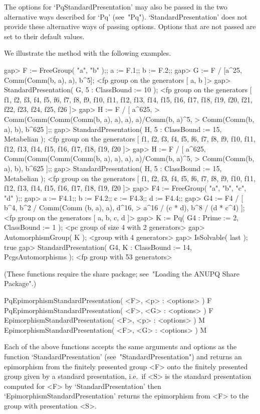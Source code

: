 \enditems

The options for `PqStandardPresentation' may also be passed  in  the  two
alternative ways described for  `Pq'  (see~"Pq").  `StandardPresentation'
does not provide these alternative ways of passing options. Options  that
are not passed are set to their default values.

We illustrate the method with the following examples.

\beginexample
gap> F := FreeGroup( "a", "b" );; a := F.1;; b := F.2;;
gap> G := F / [a^25, Comm(Comm(b, a), a), b^5];        
<fp group on the generators [ a, b ]>
gap> StandardPresentation( G, 5 : ClassBound := 10 );  
<fp group on the generators [ f1, f2, f3, f4, f5, f6, f7, f8, f9, f10, f11, 
  f12, f13, f14, f15, f16, f17, f18, f19, f20, f21, f22, f23, f24, f25, f26 ]>
gap> H := F / [ a^625,
>               Comm(Comm(Comm(Comm(b, a), a), a), a)/Comm(b, a)^5,
>               Comm(Comm(b, a), b), b^625 ];;
gap> StandardPresentation( H, 5 : ClassBound := 15, Metabelian );
<fp group on the generators [ f1, f2, f3, f4, f5, f6, f7, f8, f9, f10, f11, 
  f12, f13, f14, f15, f16, f17, f18, f19, f20 ]>
gap> H := F / [ a^625, Comm(Comm(Comm(Comm(b, a), a), a), a)/Comm(b, a)^5,
>               Comm(Comm(b, a), b), b^625 ];;                     
gap> StandardPresentation( H, 5 : ClassBound := 15, Metabelian );
<fp group on the generators [ f1, f2, f3, f4, f5, f6, f7, f8, f9, f10, f11, 
  f12, f13, f14, f15, f16, f17, f18, f19, f20 ]>
gap> F4 := FreeGroup( "a", "b", "c", "d" );;                        
gap> a := F4.1;; b := F4.2;; c := F4.3;; d := F4.4;;
gap> G4 := F4 / [ b^4, b^2 / Comm(Comm (b, a), a), d^16,                
>                 a^16 / (c * d), b^8 / (d * c^4) ];
<fp group on the generators [ a, b, c, d ]>
gap> K := Pq( G4 : Prime := 2, ClassBound := 1 );
<pc group of size 4 with 2 generators>
gap> AutomorphismGroup( K );
<group with 4 generators>
gap> IsSolvable( last );
true
gap> StandardPresentation( G4, K : ClassBound := 14, PcgsAutomorphisms );
<fp group with 53 generators>
\endexample

(These functions require the {\ANUPQ}  share  package;  see~"Loading  the
ANUPQ Share Package".)

\>PqEpimorphismStandardPresentation( <F>, <p> : <options> ) F
\>PqEpimorphismStandardPresentation( <F>, <G> : <options> ) F
\>EpimorphismStandardPresentation( <F>, <p> : <options> ) M
\>EpimorphismStandardPresentation( <F>, <G> : <options> ) M

Each of the above functions accepts the same arguments and options as the
function `StandardPresentation' (see~"StandardPresentation") and  returns
an epimorphism from the finitely presented group <F>  onto  the  finitely
presented group given by a standard  presentation,  i.e.~if  <S>  is  the
standard presentation computed for  <F>  by  `StandardPresentation'  then
`EpimorphismStandardPresentation' returns the epimorphism from <F> to the
group with presentation <S>.

